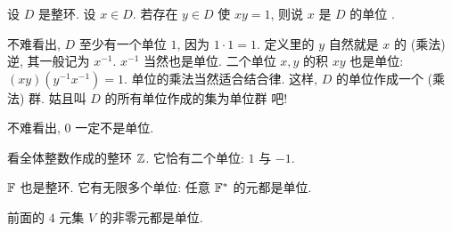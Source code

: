 \subsubsection*{\UnitsAndFields}

\begin{definition}
    设 $D$ 是整环. 设 $x \in D$. 若存在 $y \in D$ 使 $xy=1$, 则说 $x$ 是 $D$ 的单位 .
\end{definition}

\begin{remark}
    不难看出, $D$ 至少有一个单位 $1$, 因为 $1 \cdot 1 = 1$. 定义里的 $y$ 自然就是 $x$ 的 (乘法) 逆, 其一般记为 $x^{-1}$. $x^{-1}$ 当然也是单位. 二个单位 $x,y$ 的积 $xy$ 也是单位: $(xy)(y^{-1}x^{-1})=1$. 单位的乘法当然适合结合律. 这样, $D$ 的单位作成一个 (乘法) 群. 姑且叫 $D$ 的所有单位作成的集为单位群  吧!
\end{remark}

\begin{remark}
    不难看出, $0$ 一定不是单位.
\end{remark}

\begin{example}
    看全体整数作成的整环 $\mathbb{Z}$. 它恰有二个单位: $1$ 与 $-1$.
\end{example}

\begin{example}
    $\mathbb{F}$ 也是整环. 它有无限多个单位: 任意 $\mathbb{F}^{\ast}$ 的元都是单位.
\end{example}

\begin{example}
    前面的 $4$ 元集 $V$ 的非零元都是单位.
\end{example}

